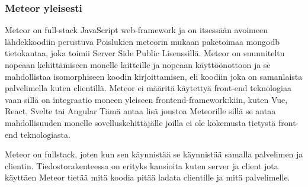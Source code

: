 



\subsubsection{Meteor yleisesti}


%



Meteor on full-stack JavaScript web-framework ja on itsessään avoimeen lähdekkoodiin perustuva 
Poislukien meteorin mukaan paketoimaa mongodb tietokantaa, joka toimii Server Side Public Lisenssillä.
Meteor on suunniteltu nopeaan kehittämiseen monelle laitteille ja nopeaan käyttöönottoon ja se mahdollistaa isomorphiseen koodin kirjoittamisen, 
eli koodiin joka on samanlaista palvelimella kuten clientillä. %
Meteor ei määritä käytettyä front-end teknologiaa vaan sillä on integraatio moneen yleiseen frontend-framework:kiin, kuten Vue, React, Svelte tai Angular 
Tämä antaa lisä joustoa Meteorille sillä se antaa mahdollisuuden monelle sovelluskehittäjälle joilla ei ole kokemusta tietystä front-end teknologiasta.
\medskip

Meteor on fullstack, joten kun sen käynnistää se käynnistää samalla palvelimen ja clientin.
Tiedostorakenteessa on erityks kansioita kuten server ja client jota käyttäen Meteor tietää mitä koodia pitää ladata clientille ja mitä palvelimelle.
\medskip



